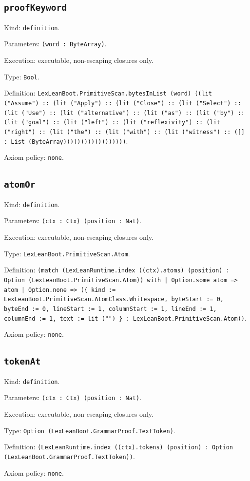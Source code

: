 \documentclass[11pt]{article}
\begin{document}
\subsection*{\texttt{proofKeyword}}
\noindent Kind: \texttt{definition}.\par
\noindent Parameters: \texttt{(word : ByteArray)}.\par
\noindent Execution: executable, non-escaping closures only.\par
\noindent Type: \texttt{Bool}.\par
\noindent Definition: \texttt{LexLeanBoot.PrimitiveScan.bytesInList (word) ((lit ("Assume") :: (lit ("Apply") :: (lit ("Close") :: (lit ("Select") :: (lit ("Use") :: (lit ("alternative") :: (lit ("as") :: (lit ("by") :: (lit ("goal") :: (lit ("left") :: (lit ("reflexivity") :: (lit ("right") :: (lit ("the") :: (lit ("with") :: (lit ("witness") :: ([] : List (ByteArray))))))))))))))))))}.\par
\noindent Axiom policy: \texttt{none}.\par
\subsection*{\texttt{atomOr}}
\noindent Kind: \texttt{definition}.\par
\noindent Parameters: \texttt{(ctx : Ctx) (position : Nat)}.\par
\noindent Execution: executable, non-escaping closures only.\par
\noindent Type: \texttt{LexLeanBoot.PrimitiveScan.Atom}.\par
\noindent Definition: \texttt{(match (LexLeanRuntime.index ((ctx).atoms) (position) : Option (LexLeanBoot.PrimitiveScan.Atom)) with | Option.some atom => atom | Option.none => (\{ kind := LexLeanBoot.PrimitiveScan.AtomClass.Whitespace, byteStart := 0, byteEnd := 0, lineStart := 1, columnStart := 1, lineEnd := 1, columnEnd := 1, text := lit ("") \} : LexLeanBoot.PrimitiveScan.Atom))}.\par
\noindent Axiom policy: \texttt{none}.\par
\subsection*{\texttt{tokenAt}}
\noindent Kind: \texttt{definition}.\par
\noindent Parameters: \texttt{(ctx : Ctx) (position : Nat)}.\par
\noindent Execution: executable, non-escaping closures only.\par
\noindent Type: \texttt{Option (LexLeanBoot.GrammarProof.TextToken)}.\par
\noindent Definition: \texttt{(LexLeanRuntime.index ((ctx).tokens) (position) : Option (LexLeanBoot.GrammarProof.TextToken))}.\par
\noindent Axiom policy: \texttt{none}.\par
\end{document}
